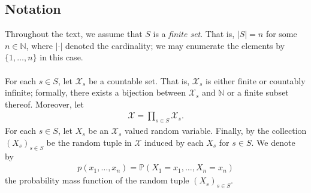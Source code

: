 \documentclass{article}
\begin{document}
\subsection*{Notation}
Throughout the text, we assume that $S$ is a \textit{finite set}. That is, $|S| = n$ for some $n \in \mathbb{N}$, where $|\cdot|$ denoted the cardinality; we may enumerate the elements by $\{1,\dots, n\}$ in this case.\\\\
For each $s \in S$, let $\mathcal{X}_s$ be a countable set. That is, $\mathcal{X}_s$ is either finite or countably infinite; formally, there exists a bijection between $\mathcal{X}_s$ and $\mathbb{N}$ or a finite subset thereof. Moreover, let 
\begin{align}\label{eq:product-set}
    \mathcal{X} = \prod_{s \in S} \mathcal{X}_s.
\end{align} 
For each $s \in S$, let $X_s$ be an $\mathcal{X}_{s}$ valued random variable. Finally, by the collection $(X_s)_{s \in S}$ be the random tuple in $\mathcal{X}$ induced by each $X_s$ for $s \in S$. We denote by 
\begin{align}\label{eq:pmf-xs}
    p(x_1, \dots, x_n) = \mathbb{P}(X_1 = x_1, \dots, X_n = x_n)
\end{align}
the probability mass function of the random tuple $(X_s)_{s\in S}$. 
\end{document}
